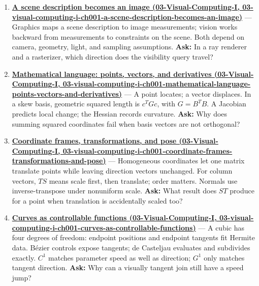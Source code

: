 \begin{enumerate}
\def\labelenumi{\arabic{enumi}.}
\item
  \textbf{\href{../03-Visual-Computing-I/main.pdf\#nameddest=03-visual-computing-i-ch001-a-scene-description-becomes-an-image}{A scene description becomes an image (03-Visual-Computing-I, 03-visual-computing-i-ch001-a-scene-description-becomes-an-image)}} --- Graphics maps a scene description to image measurements; vision works backward from measurements to constraints on the scene. Both depend on camera, geometry, light, and sampling assumptions. \textbf{Ask:} In a ray renderer and a rasterizer, which direction does the visibility query travel?
\item
  \textbf{\href{../03-Visual-Computing-I/main.pdf\#nameddest=03-visual-computing-i-ch001-mathematical-language-points-vectors-and-derivatives}{Mathematical language: points, vectors, and derivatives (03-Visual-Computing-I, 03-visual-computing-i-ch001-mathematical-language-points-vectors-and-derivatives)}} --- A point locates; a vector displaces. In a skew basis, geometric squared length is \(c^T Gc\), with \(G=B^TB\). A Jacobian predicts local change; the Hessian records curvature. \textbf{Ask:} Why does summing squared coordinates fail when basis vectors are not orthogonal?
\item
  \textbf{\href{../03-Visual-Computing-I/main.pdf\#nameddest=03-visual-computing-i-ch001-coordinate-frames-transformations-and-pose}{Coordinate frames, transformations, and pose (03-Visual-Computing-I, 03-visual-computing-i-ch001-coordinate-frames-transformations-and-pose)}} --- Homogeneous coordinates let one matrix translate points while leaving direction vectors unchanged. For column vectors, \(TS\) means scale first, then translate; order matters. Normals use inverse-transpose under nonuniform scale. \textbf{Ask:} What result does \(ST\) produce for a point when translation is accidentally scaled too?
\item
  \textbf{\href{../03-Visual-Computing-I/main.pdf\#nameddest=03-visual-computing-i-ch001-curves-as-controllable-functions}{Curves as controllable functions (03-Visual-Computing-I, 03-visual-computing-i-ch001-curves-as-controllable-functions)}} --- A cubic has four degrees of freedom: endpoint positions and endpoint tangents fit Hermite data. Bézier controls expose tangents; de Casteljau evaluates and subdivides exactly. \(C^1\) matches parameter speed as well as direction; \(G^1\) only matches tangent direction. \textbf{Ask:} Why can a visually tangent join still have a speed jump?

\end{enumerate}
